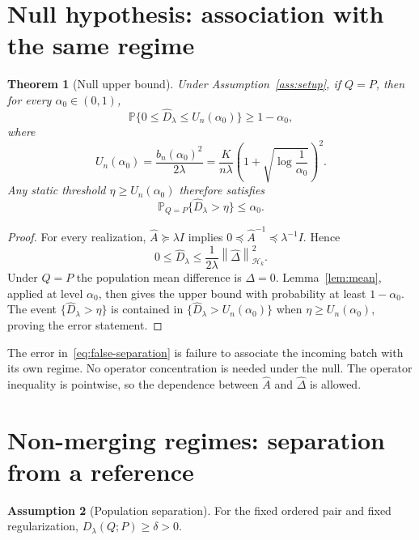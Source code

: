\documentclass[11pt,a4paper]{article}
\newtheorem{theorem}{Theorem}[section]
\theoremstyle{definition}
\newtheorem{assumption}[theorem]{Assumption}
\theoremstyle{remark}
\newcommand{\HH}{\mathcal H_k}
\newcommand{\Prob}{\mathbb P}
\newcommand{\norm}[1]{\left\lVert#1\right\rVert}
\newcommand{\D}{D_\lambda(Q;P)}
\newcommand{\Dh}{\widehat D_\lambda}
\begin{document}
\section{Null hypothesis: association with the same regime}\label{sec:null}
\begin{theorem}[Null upper bound]\label{thm:null}
Under Assumption~\ref{ass:setup}, if $Q=P$, then for every
$\alpha_0\in(0,1)$,
\begin{equation}\label{eq:null}
 \Prob\{0\le\Dh\le U_n(\alpha_0)\}\ge1-\alpha_0,
\end{equation}
where
\begin{equation}\label{eq:U}
 \boxed{U_n(\alpha_0)=\frac{b_n(\alpha_0)^2}{2\lambda}
 =\frac{K}{n\lambda}
       \left(1+\sqrt{\log\frac1{\alpha_0}}\right)^2.}
\end{equation}
Any static threshold $\eta\ge U_n(\alpha_0)$ therefore satisfies
\begin{equation}\label{eq:false-separation}
 \Prob_{Q=P}\{\Dh>\eta\}\le\alpha_0.
\end{equation}
\end{theorem}
\begin{proof}
For every realization, $\widehat A\succeq\lambda I$ implies
$0\preceq\widehat A^{-1}\preceq\lambda^{-1}I$. Hence
\begin{equation}\label{eq:null-domination}
 0\le\Dh\le\frac1{2\lambda}\norm{\widehat\Delta}_{\HH}^2.
\end{equation}
Under $Q=P$ the population mean difference is $\Delta=0$.
Lemma~\ref{lem:mean}, applied at level $\alpha_0$, then gives the
upper bound with probability at least $1-\alpha_0$.
The event $\{\Dh>\eta\}$ is contained in $\{\Dh>U_n(\alpha_0)\}$
when $\eta\ge U_n(\alpha_0)$, proving the error statement.
\end{proof}
The error in~\eqref{eq:false-separation} is failure to associate the
incoming batch with its own regime. No operator concentration is
needed under the null. The operator inequality is pointwise, so the
dependence between $\widehat A$ and $\widehat\Delta$ is allowed.

\section{Non-merging regimes: separation from a reference}\label{sec:alternative}
\begin{assumption}[Population separation]\label{ass:separation}
For the fixed ordered pair and fixed regularization, $\D\ge\delta>0$.
\end{assumption}
\end{document}
